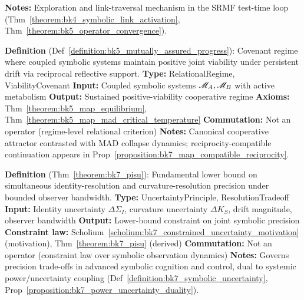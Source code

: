 \begin{description}[leftmargin=2.5cm, style=nextline]
\textbf{Notes:} Exploration and link-traversal mechanism in the SRMF test-time
loop (Thm~\ref{theorem:bk4_symbolic_link_activation},
Thm~\ref{theorem:bk5_operator_convergence}).

\item[\textbf{Mutually Assured Progress} \hfill \ensuremath{\mathrm{MAP}}] 
\label{dict:appA_mutually_assured_progress}
\textbf{Definition} (Def~\ref{definition:bk5_mutually_assured_progress}): Covenant regime where coupled symbolic systems maintain positive joint viability under persistent drift via reciprocal reflective support.
\textbf{Type:} RelationalRegime, ViabilityCovenant
\textbf{Input:} Coupled symbolic systems \( \mathscr{M}_A, \mathscr{M}_B \) with active metabolism
\textbf{Output:} Sustained positive-viability cooperative regime
\textbf{Axioms:} Thm~\ref{theorem:bk5_map_equilibrium}, Thm~\ref{theorem:bk5_map_mad_critical_temperature}
\textbf{Commutation:} Not an operator (regime-level relational criterion)
\textbf{Notes:} Canonical cooperative attractor contrasted with MAD collapse dynamics; reciprocity-compatible continuation appears in Prop~\ref{proposition:bk7_map_compatible_reciprocity}.

\item[\textbf{Universal Symbolic Uncertainty Principle (PISU)} \hfill \ensuremath{\Delta\Sigma_I \cdot \Delta K_S}] 
\label{dict:appA_universal_symbolic_uncertainty_principle}
\textbf{Definition} (Thm~\ref{theorem:bk7_pisu}): Fundamental lower bound on simultaneous identity-resolution and curvature-resolution precision under bounded observer bandwidth.
\textbf{Type:} UncertaintyPrinciple, ResolutionTradeoff
\textbf{Input:} Identity uncertainty \( \Delta\Sigma_I \), curvature uncertainty \( \Delta K_S \), drift magnitude, observer bandwidth
\textbf{Output:} Lower-bound constraint on joint symbolic precision
\textbf{Constraint law:} Scholium~\ref{scholium:bk7_constrained_uncertainty_motivation} (motivation), Thm~\ref{theorem:bk7_pisu} (derived)
\textbf{Commutation:} Not an operator (constraint law over symbolic observation dynamics)
\textbf{Notes:} Governs precision trade-offs in advanced symbolic cognition and control, dual to systemic power/uncertainty coupling (Def~\ref{definition:bk7_symbolic_uncertainty}, Prop~\ref{proposition:bk7_power_uncertainty_duality}).


\end{description}
